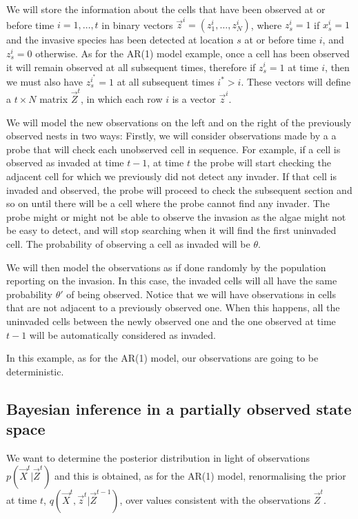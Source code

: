 We will store the information about the cells that have been observed at or before time $i = 1, \dots, t$ in binary vectors $\vec{z}^{i} = (z_1^{i}, \dots, z_{N}^{i})$, where $z_s^{i} = 1$ if $x_s^{i} = 1$ and the invasive species has been detected at location $s$ at or before time $i$, and $z_s^{i} = 0$ otherwise. As for the AR(1) model example, once a cell has been observed it will remain observed at all subsequent times, therefore if $z_s^{i} = 1$ at time $i$, then we must also have $z_s^{i^{*}} = 1$ at all subsequent times $i^{*} > i$. These vectors will define a $t \times N$ matrix $\vec{Z}^{t}$, in which each row $i$ is a vector $\vec{z}^{i}$.

We will model the new observations on the left and on the right of the previously observed nests in two ways: Firstly, we will consider observations made by a a probe that will check each unobserved cell in sequence. For example, if a cell is observed as invaded at time $t-1$, at time $t$ the probe will start checking the adjacent cell for which we previously did not detect any invader. If that cell is invaded and observed, the probe will proceed to check the subsequent section and so on until there will be a cell where the probe cannot find any invader. The probe might or might not be able to observe the invasion as the algae might not be easy to detect, and will stop searching when it will find the first uninvaded cell. The probability of observing a cell as invaded will be $\theta$.

We will then model the observations as if done randomly by the population reporting on the invasion. In this case, the invaded cells will all have the same probability $\theta'$ of being observed. Notice that we will have observations in cells that are not adjacent to a previously observed one. When this happens, all the uninvaded cells between the newly observed one and the one observed at time $t-1$ will be automatically considered as invaded.

In this example, as for the AR(1) model, our observations are going to be deterministic.

\subsection{Bayesian inference in a partially observed state space}

We want to determine the posterior distribution in light of observations $p(\vec{X}^{t} | \vec{Z}^{t})$ and this is obtained, as for the AR(1) model, renormalising the prior at time $t$, $q(\vec{X}^{t}, \vec{z}^{t} | \vec{Z}^{t-1})$, over values consistent with the observations $\vec{Z}^{t}$.

